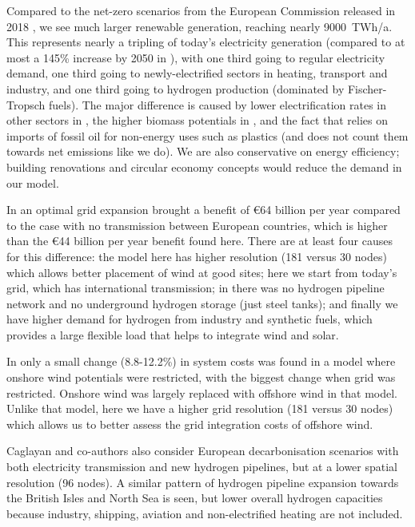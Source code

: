Compared to the net-zero scenarios from the European Commission
released in 2018 \cite{in-depth_2018}, we see much larger renewable
generation, reaching nearly 9000~TWh/a. This represents nearly a
tripling of today's electricity generation (compared to at most a
145\% increase by 2050 in \cite{in-depth_2018}), with one third going
to regular electricity demand, one third going to newly-electrified
sectors in heating, transport and industry, and one third going to
hydrogen production (dominated by Fischer-Tropsch fuels). The major
difference is caused by lower electrification rates in other sectors
in \cite{in-depth_2018}, the higher biomass potentials
in \cite{in-depth_2018}, and the fact that \cite{in-depth_2018} relies
on imports of fossil oil for non-energy uses such as plastics (and
does not count them towards net emissions like we do). We are also
conservative on energy efficiency; building renovations and
circular economy concepts would reduce the demand in our model.

In \cite{BROWN2018720} an optimal grid expansion brought a benefit
of \euro64 billion per year compared to the case with no transmission
between European countries, which is higher than the \euro44 billion
per year benefit found here. There are at least four causes for this
difference: the model here has higher resolution (181 versus 30 nodes)
which allows better placement of wind at good sites; here we start
from today's grid, which has international transmission;
in \cite{BROWN2018720} there was no hydrogen pipeline network and no
underground hydrogen storage (just steel tanks); and finally we have
higher demand for hydrogen from industry and synthetic fuels, which
provides a large flexible load that helps to integrate wind and solar.

In \cite{Schlachtberger2018} only a small change
(8.8-12.2\%) in system costs was found in a model where onshore wind potentials
were restricted, with the biggest change when grid was
restricted. Onshore wind was largely replaced with offshore wind in
that model. Unlike that model, here we have a higher grid resolution
(181 versus 30 nodes) which allows us to better assess the grid
integration costs of offshore wind.

Caglayan and co-authors \cite{Caglayan2019} also consider European
decarbonisation scenarios with both electricity transmission and new
hydrogen pipelines, but at a lower spatial resolution (96 nodes). A
similar pattern of hydrogen pipeline expansion towards the British
Isles and North Sea is seen, but lower overall hydrogen capacities
because industry, shipping, aviation and non-electrified heating are
not included.


